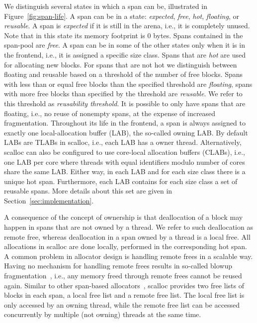 \documentclass[10pt]{sigplanconf}
\begin{document}
We distinguish several states in which a span can be, illustrated in
Figure~\ref{fig:span-life}. A span can be in a state: \emph{expected},
\emph{free}, \emph{hot}, \emph{floating}, or \emph{reusable}. A span is 
\emph{expected} if it is still in the arena, i.e., it is completely unused. Note
that in this state its memory footprint is 0 bytes. Spans contained in the
span-pool are \emph{free}. A span can be in some of the other states only when
it is in the frontend, i.e., it is assigned a specific size class. Spans that
are \emph{hot} are used for allocating new blocks. For spans that are not hot we
distinguish between floating and reusable based on a threshold of the number of
free blocks. Spans with less than or equal free blocks than the specified
threshold are \emph{floating}, spans with more free blocks than specified by the
threshold are \emph{reusable}. We refer to this threshold as \emph{reusability
threshold}. It is possible to only have spans that are floating, i.e., no reuse
of nonempty spans, at the expense of increased fragmentation. Throughout its
life in the frontend, a span is always assigned to exactly one local-allocation buffer (LAB), the so-called owning LAB. By default LABs are TLABs in scalloc, i.e., each LAB has a owner thread. Alternatively, scalloc can also be configured to use core-local allocation buffers (CLABs), i.e., one LAB per core where threads with equal identifiers modulo number of cores share the same LAB. Either way, in each LAB and for each size class there is a unique hot span. Furthermore, each LAB contains for each size class a set of reusable spans. More details about this set are given in Section~\ref{sec:implementation}.

A consequence of the concept
of ownership is that deallocation of a block may happen in spans that are not
owned by a thread. We refer to such deallocation as remote free, whereas
deallocation in a span owned by a thread is a local free. All allocations in
scalloc are done locally, performed in the corresponding hot span. A common problem in
allocator design is handling remote frees in a scalable way. Having no mechanism for handling remote frees results in so-called blowup
fragmentation~\cite{Berger:ASPLOS00}, i.e., any memory freed through remote frees cannot be reused again. Similar to other span-based
allocators~\cite{Schneider:ISMM06,llalloc}, scalloc provides two free lists of
blocks in each span, a local free list and a remote free list. The local free
list is only accessed by an owning thread, while the remote free list can be
accessed concurrently by multiple (not owning) threads at the same time.
\end{document}
